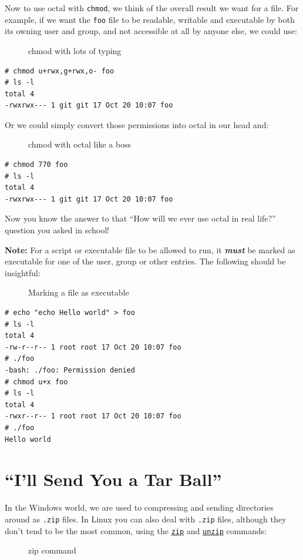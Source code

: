\documentclass[10pt,]{book}
\numberwithin{figure}{chapter}
\DeclareRobustCommand{\drcap}[1]{\begin{figure}[H]\caption{#1}\end{figure}}
\DeclareRobustCommand{\drcmd}[1]{\index{Commands!#1}}
\begin{document}
Now to use octal with \texttt{chmod}, we think of the overall result we
want for a file. For example, if we want the \texttt{foo} file to be
readable, writable and executable by both its owning user and group, and
not accessible at all by anyone else, we could use:

\drcap{chmod with lots of typing}

\begin{verbatim}
# chmod u+rwx,g+rwx,o- foo
# ls -l
total 4
-rwxrwx--- 1 git git 17 Oct 20 10:07 foo
\end{verbatim}

Or we could simply convert those permissions into octal in our head and:

\drcap{chmod with octal like a boss}

\begin{verbatim}
# chmod 770 foo
# ls -l
total 4
-rwxrwx--- 1 git git 17 Oct 20 10:07 foo
\end{verbatim}

Now you know the answer to that ``How will we ever use octal in real
life?'' question you asked in school!

\textbf{Note:} For a script or executable file to be allowed to run, it
\textbf{\emph{must}} be marked as executable for one of the user, group
or other entries. The following should be insightful:

\drcap{Marking a file as executable}

\begin{verbatim}
# echo "echo Hello world" > foo
# ls -l
total 4
-rw-r--r-- 1 root root 17 Oct 20 10:07 foo
# ./foo
-bash: ./foo: Permission denied
# chmod u+x foo
# ls -l
total 4
-rwxr--r-- 1 root root 17 Oct 20 10:07 foo
# ./foo
Hello world
\end{verbatim}

\section{``I'll Send You a Tar Ball''}\label{ill-send-you-a-tar-ball}

In the Windows world, we are used to compressing and sending directories
around as \texttt{.zip} files. In Linux you can also deal with
\texttt{.zip} files, although they don't tend to be the most common,
using the \href{http://linux.die.net/man/1/zip}{\texttt{zip}}\drcmd{zip}
and \href{http://linux.die.net/man/1/unzip}{\texttt{unzip}}\drcmd{unzip}
commands:

\drcap{zip command}
\end{document}
